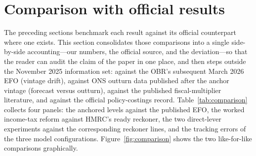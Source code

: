\section{Comparison with official results}
\label{sec:comparison}

The preceding sections benchmark each result against its official counterpart where one exists. This section consolidates those comparisons into a single side-by-side accounting---our numbers, the official source, and the deviation---so that the reader can audit the claim of the paper in one place, and then steps outside the November 2025 information set: against the OBR's subsequent March 2026 EFO (vintage drift), against ONS outturn data published after the anchor vintage (forecast versus outturn), against the published fiscal-multiplier literature, and against the official policy-costings record. Table~\ref{tab:comparison} collects four panels: the anchored levels against the published EFO, the worked income-tax reform against HMRC's ready reckoner, the two direct-lever experiments against the corresponding reckoner lines, and the tracking errors of the three model configurations. Figure~\ref{fig:comparison} shows the two like-for-like comparisons graphically.

